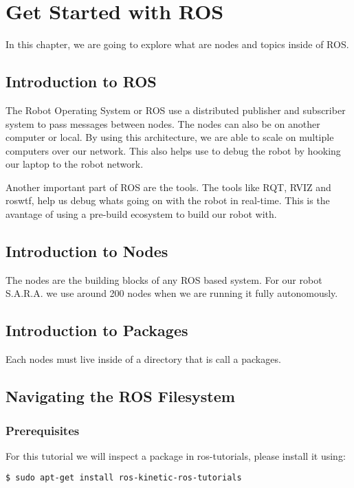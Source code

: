 \chapter{Get Started with ROS}
In this chapter, we are going to explore what are nodes and topics inside of ROS.

\newpage
\section{Introduction to ROS}
 The Robot Operating System or ROS use a distributed publisher and subscriber system to pass messages between nodes. The nodes can also be on another computer or local. By using this architecture, we are able to scale on multiple computers over our network. This also helps use to debug the robot by hooking our laptop to the robot network. 
 
 Another important part of ROS are the tools. The tools like RQT, RVIZ and roswtf, help us debug whats going on with the robot in real-time. This is the avantage of using a pre-build ecosystem to build our robot with.

\newpage

\section{Introduction to Nodes}
The nodes are the building blocks of any ROS based system. For our robot S.A.R.A. we use around 200 nodes when we are running it fully autonomously. 

\newpage

\section{Introduction to Packages}
Each nodes must live inside of a directory that is call a packages.

\newpage

\section{Navigating the ROS Filesystem}
\subsection{Prerequisites}
For this tutorial we will inspect a package in ros-tutorials, please install it using:

\begin{lstlisting}[breaklines=True language=bash]
$ sudo apt-get install ros-kinetic-ros-tutorials
\end{lstlisting}

